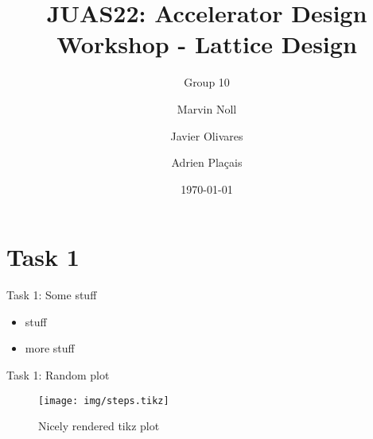 \documentclass{beamer}
\title[Topic III: Lattice Design]{JUAS22: Accelerator Design Workshop - Lattice Design}
\subtitle{Group 10}
\author[Noll, Olivares, Plaçais]{Marvin Noll \and Javier Olivares \and Adrien Plaçais}
\date[\today]{\today}
\begin{document}
\begin{frame}[plain]
  \titlepage
  \end{frame}

\section{Task 1}
\begin{frame}[t]{Task 1: Some stuff}
\begin{itemize}
\item stuff
\item more stuff
\end{itemize}
\end{frame}

\begin{frame}[t]{Task 1: Random plot}
\begin{figure}
\centering
\texttt{[image: img/steps.tikz]}
\caption{Nicely rendered tikz plot}
\end{figure}
\end{frame}
\end{document}
